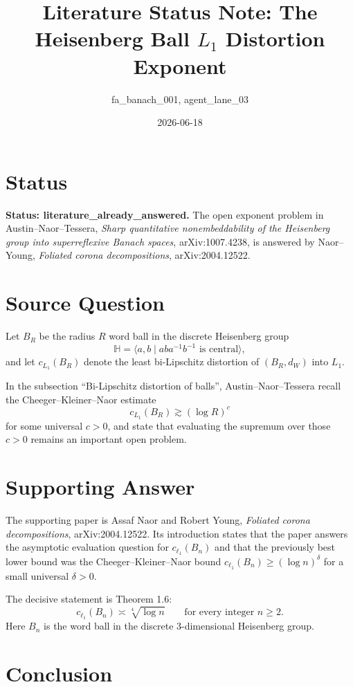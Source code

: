 \documentclass[11pt]{article}
\title{Literature Status Note: The Heisenberg Ball \(L_1\) Distortion Exponent}
\author{fa\_banach\_001, agent\_lane\_03}
\date{2026-06-18}
\begin{document}
\maketitle

\section*{Status}

\textbf{Status: literature\_already\_answered.}
The open exponent problem in Austin--Naor--Tessera,
\emph{Sharp quantitative nonembeddability of the Heisenberg group into
superreflexive Banach spaces}, arXiv:1007.4238, is answered by
Naor--Young, \emph{Foliated corona decompositions}, arXiv:2004.12522.

\section*{Source Question}

Let \(B_R\) be the radius \(R\) word ball in the discrete Heisenberg group
\[
\mathbb H=\langle a,b\mid aba^{-1}b^{-1}\text{ is central}\rangle,
\]
and let \(c_{L_1}(B_R)\) denote the least bi-Lipschitz distortion of
\((B_R,d_W)\) into \(L_1\).

In the subsection ``Bi-Lipschitz distortion of balls'', Austin--Naor--Tessera
recall the Cheeger--Kleiner--Naor estimate
\[
c_{L_1}(B_R)\gtrsim (\log R)^c
\]
for some universal \(c>0\), and state that evaluating the supremum over
those \(c>0\) remains an important open problem.

\section*{Supporting Answer}

The supporting paper is Assaf Naor and Robert Young,
\emph{Foliated corona decompositions}, arXiv:2004.12522. Its introduction
states that the paper answers the asymptotic evaluation question for
\(c_{\ell_1}(B_n)\) and that the previously best lower bound was the
Cheeger--Kleiner--Naor bound \(c_{\ell_1}(B_n)\ge (\log n)^\delta\) for a
small universal \(\delta>0\).

The decisive statement is Theorem 1.6:
\[
c_{\ell_1}(B_n)\asymp \sqrt[4]{\log n}\qquad\text{for every integer }n\ge 2.
\]
Here \(B_n\) is the word ball in the discrete 3-dimensional Heisenberg group.

\section*{Conclusion}
\end{document}
